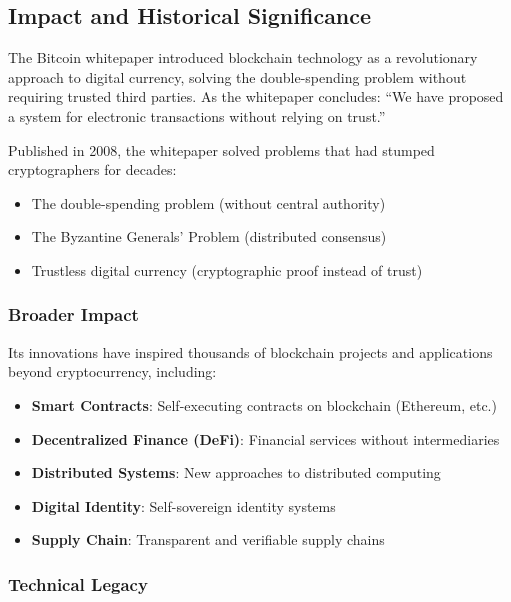 \subsection{Impact and Historical Significance}
\label{subsec:impact}

The Bitcoin whitepaper introduced blockchain technology as a revolutionary approach to digital currency, solving the double-spending problem without requiring trusted third parties. As the whitepaper concludes: ``We have proposed a system for electronic transactions without relying on trust.''

Published in 2008, the whitepaper solved problems that had stumped cryptographers for decades:

\begin{itemize}
  \item The double-spending problem (without central authority)
  \item The Byzantine Generals' Problem (distributed consensus)
  \item Trustless digital currency (cryptographic proof instead of trust)
\end{itemize}

\subsubsection{Broader Impact}

Its innovations have inspired thousands of blockchain projects and applications beyond cryptocurrency, including:

\begin{itemize}
  \item \textbf{Smart Contracts}: Self-executing contracts on blockchain (Ethereum, etc.)
  \item \textbf{Decentralized Finance (DeFi)}: Financial services without intermediaries
  \item \textbf{Distributed Systems}: New approaches to distributed computing
  \item \textbf{Digital Identity}: Self-sovereign identity systems
  \item \textbf{Supply Chain}: Transparent and verifiable supply chains
\end{itemize}

\subsubsection{Technical Legacy}

